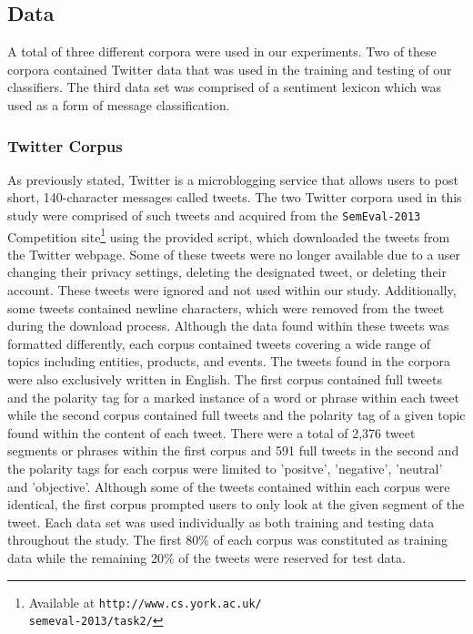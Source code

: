 \documentclass[11pt]{article}
\begin{document}
\subsection{Data}
A total of three different corpora were used in our experiments. Two of these corpora contained Twitter data that was used in the training and testing of our classifiers. The third data set was comprised of a sentiment lexicon which was used as a form of message classification.

\subsubsection*{Twitter Corpus}
As previously stated, Twitter is a microblogging service that allows users to post short, 140-character messages called tweets.  The two Twitter corpora used in this study were comprised of such tweets and acquired from the {\tt SemEval-2013} Competition site\footnote{Available at {\tt http://www.cs.york.ac.uk/{\\}semeval-2013/task2/}} using the provided script, which downloaded the tweets from the Twitter webpage. Some of these tweets were no longer available due to a user changing their privacy settings, deleting the designated tweet, or deleting their account. These tweets were ignored and not used within our study. Additionally, some tweets contained newline characters, which were removed from the tweet during the download process. Although the data found within these tweets was formatted differently, each corpus contained tweets covering a wide range of topics including entities, products, and events. The tweets found in the corpora were also exclusively written in English. The first corpus contained full tweets and the polarity tag for a marked instance of a word or phrase within each tweet while the second corpus contained full tweets and the polarity tag of a given topic found within the content of each tweet. There were a total of 2,376 tweet segments or phrases within the first corpus and 591 full tweets in the second and the polarity tags for each corpus were limited to 'positve', 'negative', 'neutral' and 'objective'. Although some of the tweets contained within each corpus were identical, the first corpus prompted users to only look at the given segment of the tweet. Each data set was used individually as both training and testing data throughout the study. The first 80\% of each corpus was constituted as training data while the remaining 20\% of the tweets were reserved for test data. 
\end{document}
